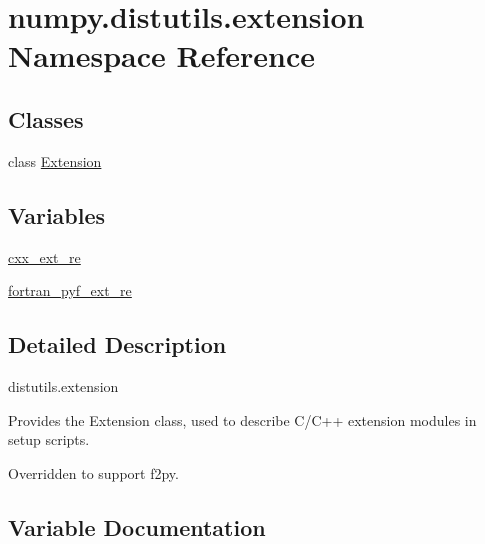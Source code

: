 \hypertarget{namespacenumpy_1_1distutils_1_1extension}{}\section{numpy.\+distutils.\+extension Namespace Reference}
\label{namespacenumpy_1_1distutils_1_1extension}
\subsection*{Classes}
\begin{DoxyCompactItemize}
\item 
class \hyperlink{classnumpy_1_1distutils_1_1extension_1_1Extension}{Extension}
\end{DoxyCompactItemize}
\subsection*{Variables}
\begin{DoxyCompactItemize}
\item 
\hyperlink{namespacenumpy_1_1distutils_1_1extension_a1857065eb5457d4f829ec46566770640}{cxx\+\_\+ext\+\_\+re}
\item 
\hyperlink{namespacenumpy_1_1distutils_1_1extension_a3527478e0d19dbd037922b0c36427e78}{fortran\+\_\+pyf\+\_\+ext\+\_\+re}
\end{DoxyCompactItemize}


\subsection{Detailed Description}
\begin{DoxyVerb}distutils.extension

Provides the Extension class, used to describe C/C++ extension
modules in setup scripts.

Overridden to support f2py.\end{DoxyVerb}
 

\subsection{Variable Documentation}
\mbox{\label{namespacenumpy_1_1distutils_1_1extension_a1857065eb5457d4f829ec46566770640}} 
